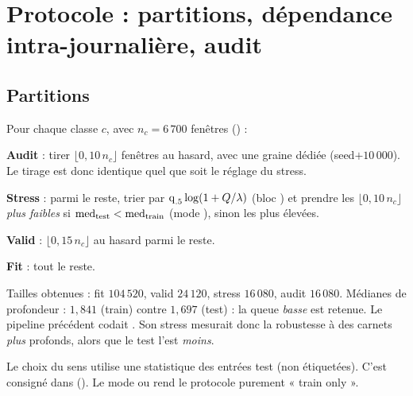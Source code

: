 \section{Protocole : partitions, dépendance intra-journalière, audit}\label{sec:protocole}

\subsection{Partitions}
Pour chaque classe $c$, avec $n_c=6\,700$ fenêtres () :
\begin{algo}[H]
\caption{Construction des partitions}
\begin{algobox}
\item \textbf{Audit} : tirer $\lfloor0{,}10\,n_c\rfloor$ fenêtres au hasard, avec une graine dédiée (seed$+10\,000$). Le tirage est donc identique quel que soit le réglage du stress.
\item \textbf{Stress} : parmi le reste, trier par $\operatorname{q}_{.5}\log(1+Q/\lambda)$ (bloc ) et prendre les $\lfloor0{,}10\,n_c\rfloor$ \emph{plus faibles} si $\operatorname{med}_{\text{test}}<\operatorname{med}_{\text{train}}$ (mode ), sinon les plus élevées.
\item \textbf{Valid} : $\lfloor0{,}15\,n_c\rfloor$ au hasard parmi le reste.
\item \textbf{Fit} : tout le reste.
\end{algobox}
\end{algo}
\noindent Tailles obtenues : fit $104\,520$, valid $24\,120$, stress $16\,080$, audit $16\,080$. Médianes de profondeur : $1{,}841$ (train) contre $1{,}697$ (test) : la queue \emph{basse} est retenue. Le pipeline précédent codait . Son stress mesurait donc la robustesse à des carnets \emph{plus} profonds, alors que le test l'est \emph{moins}.

\begin{remarque}[Transductivité]
Le choix du sens utilise une statistique des entrées test (non étiquetées). C'est consigné dans  (). Le mode  ou  rend le protocole purement « train only ».
\end{remarque}


